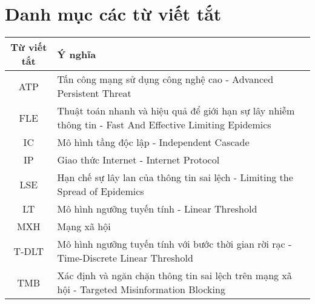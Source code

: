 \chapter*{Danh mục các từ viết tắt}
\quad 
\begin{table}[h]
\begin{center}
\large{
\begin{tabular}{|c|p{12cm}|}
\hline
\textbf{Từ viết tắt} & \textbf{Ý nghĩa}\\
\hline
ATP & Tấn công mạng sử dụng công nghệ cao - Advanced Persistent Threat\\
\hline
FLE & Thuật toán nhanh và hiệu quả để giới hạn sự lây nhiễm thông tin - Fast And Effective Limiting Epidemics\\
\hline
IC & Mô hình tầng độc lập - Independent Cascade\\
\hline
IP & Giao thức Internet - Internet Protocol\\
\hline
LSE & Hạn chế sự lây lan của thông tin sai lệch - Limiting the Spread of Epidemics\\
\hline
LT & Mô hình ngưỡng tuyến tính - Linear Threshold\\
\hline
MXH & Mạng xã hội\\
\hline
T-DLT & Mô hình ngưỡng tuyến tính với bước thời gian rời rạc - Time-Discrete Linear Threshold\\
\hline
TMB & Xác định và ngăn chặn thông tin sai lệch trên mạng xã hội - Targeted Misinformation Blocking\\
\hline
\end{tabular}
}
\end{center}
\end{table}